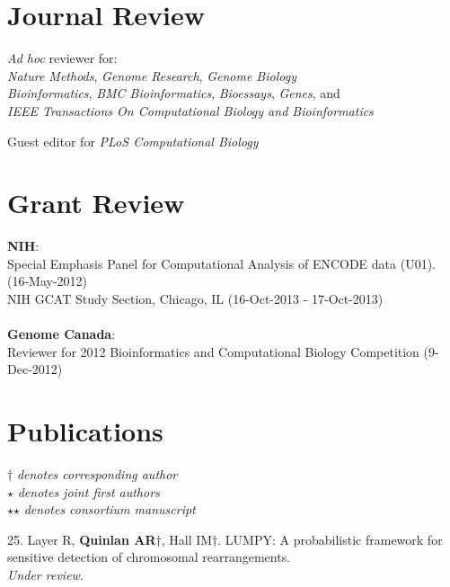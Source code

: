 \documentclass[margin,line]{cv}
\begin{document}
\begin{resume}
    

    \section{\mysidestyle Journal Review} 
    \textit{Ad hoc} reviewer for:\\ 
        \textit{Nature Methods}, \textit{Genome Research}, \textit{Genome Biology}\\
	    \textit{Bioinformatics}, \textit{BMC Bioinformatics}, \textit{Bioessays}, \textit{Genes}, and \\
        \textit{IEEE Transactions On Computational Biology and Bioinformatics}
    
    Guest editor for \textit{PLoS Computational Biology}

    \section{\mysidestyle Grant Review} 
    \textbf{NIH}:
    \\
    Special Emphasis Panel for Computational Analysis of ENCODE data (U01). (16-May-2012)\\%
    NIH GCAT Study Section, Chicago, IL (16-Oct-2013 - 17-Oct-2013)%
    \\
    \\
    \textbf{Genome Canada}:
    \\
    Reviewer for 2012 Bioinformatics and Computational Biology Competition (9-Dec-2012)
    
    \section{\mysidestyle Publications}
    $\dagger$\textit{ denotes corresponding author}\\
    $\star$\textit{ denotes joint first authors}\\
    $\star$$\star$\textit{ denotes consortium manuscript}

    \begin{list}{*}{}

    \item[25.] Layer R, \textbf{Quinlan AR}$\dagger$, Hall IM$\dagger$.
    LUMPY: A probabilistic framework for sensitive detection of chromosomal rearrangements.\\
    \emph{Under review}.


\end{list}
\end{resume}
\end{document}
